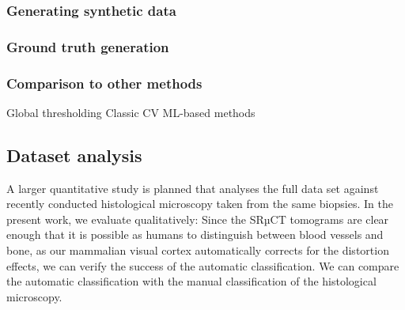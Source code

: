 \subsubsection{Generating synthetic data}
\subsubsection{Ground truth generation}
\subsubsection{Comparison to other methods}
Global thresholding
Classic CV
ML-based methods

\subsection{Dataset analysis}
A larger quantitative study is planned that analyses the full data set against
recently conducted histological microscopy taken from the same biopsies. In the
present work, we evaluate qualitatively: Since the SRµCT tomograms are clear
enough that it is possible as humans to distinguish between blood vessels and
bone, as our mammalian visual cortex automatically corrects for the distortion
effects, we can verify the success of the automatic classification. We can
compare the automatic classification with the manual classification of the
histological microscopy.

